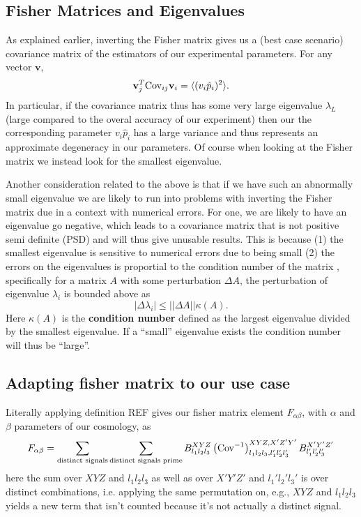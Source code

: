 \documentclass[11pt]{article} %
\DeclareRobustCommand{\Cov}{\ifmmode\text{Cov}\else d\fi}
\newcommand{\br}[1]{\ensuremath{\left( #1 \right)}}
\begin{document}
\subsection{Fisher Matrices and Eigenvalues}
As explained earlier, inverting the Fisher matrix gives us a (best case scenario) covariance matrix of the estimators of our experimental parameters. For any vector $\mathbf v$,
\begin{equation*}
    \mathbf{v}^T_j \Cov_{ij} \mathbf v_i = \langle (v_i \hat p_i)^2 \rangle.
\end{equation*}
In particular, if the covariance matrix thus has some very large eigenvalue $\lambda_L$ (large compared to the overal accuracy of our experiment) then our the corresponding parameter $v_i\hat p_i$ has a large variance and thus represents an approximate degeneracy in our parameters. Of course when looking at the Fisher matrix we instead look for the smallest eigenvalue.

Another consideration related to the above is that if we have such an abnormally small eigenvalue we are likely to run into problems with inverting the Fisher matrix due in a context with numerical errors. For one, we are likely to have an eigenvalue go negative, which leads to a covariance matrix that is not positive semi definite (PSD) and will thus give unusable results. This is because (1) the smallest eigenvalue is sensitive to numerical errors due to being small (2) the errors on the eigenvalues is proportial to the condition number of the matrix \cite{Horn2012MatrixAnalysis}, specifically for a matrix $A$ with some perturbation $\Delta A$, the perturbation of eigenvalue $\lambda_i$ is bounded above as
\begin{equation*}
    |\Delta \lambda_i | \leq ||\Delta A || \kappa(A).
\end{equation*}
Here $\kappa(A)$ is the \textbf{condition number} defined as the largest eigenvalue divided by the smallest eigenvalue. If a ``small'' eigenvalue exists the condition number will thus be ``large''. 

\subsection{Adapting fisher matrix to our use case}
Literally applying definition REF gives our fisher matrix element $F_{\alpha\beta}$, with $\alpha$ and $\beta$ parameters of our cosmology, as
\begin{equation*}
    F_{\alpha\beta} = \sum_{\text{distinct signals}}\sum_{\text{distinct signals prime}} B^{XYZ}_{l_1l_2l_3}\br{\Cov^{-1}}^{XYZ,X'Z'Y'}_{l_1l_2l_3,l_1'l_2'l_3'}B^{X'Y'Z'}_{l_1'l_2'l_3'}
\end{equation*}
here the sum over $XYZ$ and $l_1l_2l_3$ as well as over $X'Y'Z'$ and $l_1'l_2'l_3'$ is over distinct combinations, i.e. applying the same permutation on, e.g., $XYZ$ and $l_1l_2l_3$ yields a new term that isn't counted because it's not actually a distinct signal.
\end{document}
